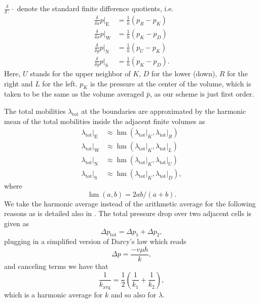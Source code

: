 \documentclass[twoside]{IEEEtran}
\newcommand*{\ddiff}[2]{\ensuremath{\frac{\delta}{\delta{#2}}{#1}}}
\DeclareMathOperator*{\hmean}{hm}
\begin{document}
$\ddiff{\cdot}{\cdot}$ denote the standard finite difference quotients, i.e.
\begin{align}
\label{differenceQuotients}
\ddiff{p}{x}\lvert_\text{E} &= \frac{1}{h}(p_R - p_K) \\
\ddiff{p}{x}\lvert_\text{W} &= \frac{1}{h}(p_K - p_D) \\
\ddiff{p}{y}\lvert_\text{N} &= \frac{1}{h}(p_U - p_K) \\
\ddiff{p}{y}\lvert_\text{S} &= \frac{1}{h}(p_K - p_D).
\end{align}
Here, $U$ stands for the upper neighbor of $K$, $D$ for the lower (down), $R$ for the right and $L$ for the left.
$p_K$ is the pressure at the center of the volume, which is taken to be the same as the volume averaged $\bar{p}$, as our scheme is just first order.

The total mobilities $\lambda_\text{tot}$ at the boundaries are approximated by the harmonic mean of the total mobilities inside the adjacent finite volumes as
\begin{align}
\label{harmonicMeans}
\lambda_\text{tot}\lvert_\text{E} &\approx \hmean(\lambda_\text{tot}\lvert_K, \lambda_\text{tot}\lvert_R) \\
\lambda_\text{tot}\lvert_\text{W} &\approx \hmean(\lambda_\text{tot}\lvert_K, \lambda_\text{tot}\lvert_L) \\
\lambda_\text{tot}\lvert_\text{N} &\approx \hmean(\lambda_\text{tot}\lvert_K, \lambda_\text{tot}\lvert_U) \\
\lambda_\text{tot}\lvert_\text{S} &\approx \hmean(\lambda_\text{tot}\lvert_K, \lambda_\text{tot}\lvert_D),
\end{align}
where \begin{equation}
\hmean(a, b) = 2ab/(a+b).
\end{equation}
We take the harmonic average instead of the arithmetic average for the following reasons as is detailed also in \cite{perminc}.
The total pressure drop over two adjacent cells is given as
\begin{equation}
\Delta p_\text{tot} = \Delta p_1 + \Delta p_2,
\end{equation}
plugging in a simplified version of Darcy's law which reads
\begin{equation}
\Delta p  = \frac{-v\mu h}{k},
\end{equation}
and canceling terms we have that
\begin{equation}
\frac{1}{k_\text{avg}} = \frac{1}{2}\left(\frac{1}{k_1} + \frac{1}{k_2}\right),
\end{equation}
which is a harmonic average for $k$ and so also for $\lambda.$
\end{document}

